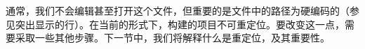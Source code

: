 通常，我们不会编辑甚至打开这个文件，但重要的是文件中的路径为硬编码的（参见突出显示的行）。在当前的形式下，构建的项目不可重定位。要改变这一点，需要采取一些其他步骤。下一节中，我们将解释什么是重定位，及其重要性。












































































